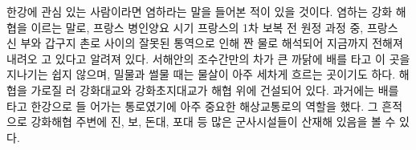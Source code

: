 한강에 관심 있는 사람이라면 염하라는 말을 들어본 적이 있을 것이다. 염하는 강화
해협을 이르는 말로, 프랑스 병인양요 시기 프랑스의 1차 보복 전 원정 과정 중, 프랑스 신
부와 갑구지 촌로 사이의 잘못된 통역으로 인해 짠 물로 해석되어 지금까지 전해져 내려오
고 있다고 알려져 있다. 서해안의 조수간만의 차가 큰 까닭에 배를 타고 이 곳을 지나기는
쉽지 않으며, 밀물과 썰물 때는 물살이 아주 세차게 흐르는 곳이기도 하다. 해협을 가로질
러 강화대교와 강화초지대교가 해협 위에 건설되어 있다. 과거에는 배를 타고 한강으로 들
어가는 통로였기에 아주 중요한 해상교통로의 역할을 했다. 그 흔적으로 강화해협 주변에
진, 보, 돈대, 포대 등 많은 군사시설들이 산재해 있음을 볼 수 있다.

